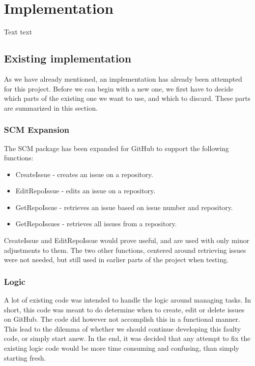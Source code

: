 
\chapter{Implementation}
\label{ch:implementation}

Text text

\section{Existing implementation}

As we have already mentioned, an implementation has already been attempted for this project.
Before we can begin with a new one, we first have to decide which parts of the existing one we want to use, and which to discard.
These parts are summarized in this section.

\subsection{SCM Expansion}
\label{sec:scm_expansion}

The SCM package has been expanded for GitHub to support the following functions:

\begin{itemize}
    \item CreateIssue   - creates an issue on a repository.
    \item EditRepoIssue - edits an issue on a repository.
    \item GetRepoIssue  - retrieves an issue based on issue number and repository.
    \item GetRepoIssues - retrieves all issues from a repository.
\end{itemize}

CreateIssue and EditRepoIssue would prove useful, and are used with only minor adjustments to them.
The two other functions, centered around retrieving issues were not needed, but still used in earlier parts of the project when testing.

\subsection{Logic}

A lot of existing code was intended to handle the logic around managing tasks. 
In short, this code was meant to do determine when to create, edit or delete issues on GitHub.
The code did however not accomplish this in a functional manner.
This lead to the dilemma of whether we should continue developing this faulty code, or simply start anew.
In the end, it was decided that any attempt to fix the existing logic code would be more time consuming and confusing, than simply starting fresh.

